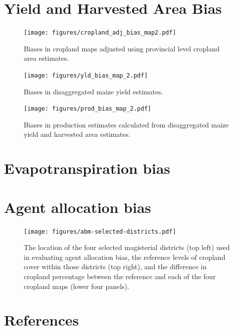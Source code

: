\documentclass[12pt]{iopart}
\begin{document}


\FloatBarrier





\section*{Yield and Harvested Area Bias}
\begin{figure}[ht]
  \centering
     \texttt{[image: figures/cropland\_adj\_bias\_map2.pdf]} 
      \caption{Biases in cropland maps adjusted using provincial level cropland area estimates.}
      \label{fig:default}
\end{figure}

\begin{figure}[ht]
  \centering
     \texttt{[image: figures/yld\_bias\_map\_2.pdf]} 
      \caption{Biases in disaggregated maize yield estimates.}
      \label{fig:default}
\end{figure}

\begin{figure}[ht]
  \centering
     \texttt{[image: figures/prod\_bias\_map\_2.pdf]} 
      \caption{Biases in production estimates calculated from disaggregated maize yield and harvested area estimates.}
      \label{fig:default}
\end{figure}

\FloatBarrier


\section*{Evapotranspiration bias}


\section*{Agent allocation bias}

\begin{figure}[ht]
  \centering
     \texttt{[image: figures/abm-selected-districts.pdf]} 
      \caption{The location of the four selected magisterial districts (top left) used in evaluating agent allocation bias, the reference levels of cropland cover within those districts (top right), and the difference in cropland percentage between the reference and each of the four cropland maps (lower four panels). }
      \label{fig:default}
\end{figure}



\FloatBarrier
\section*{References}

\end{document}
